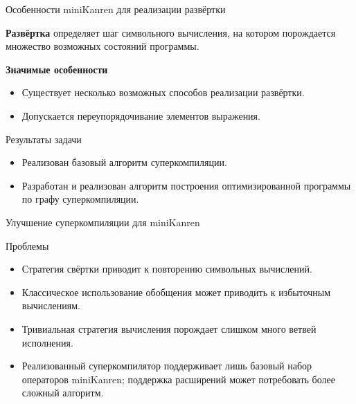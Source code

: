 \documentclass[xcolor=table]{beamer}
\begin{document}
\begin{frame}{Особенности miniKanren для реализации развёртки}
\begin{block}{}
{\bf Развёртка} определяет шаг символьного вычисления,
на котором порождается множество возможных состояний программы.
\end{block}
\vspace{0.5cm}
\begin{block}
{\bf Значимые особенности}
\begin{itemize}
\item Существует несколько возможных способов реализации развёртки.
\item Допускается переупорядочивание элементов выражения.
\end{itemize}
\end{block}
\end{frame}

\begin{frame}{Результаты задачи}
\begin{itemize}
\item Реализован базовый алгоритм суперкомпиляции.
\item Разработан и реализован алгоритм построения оптимизированной программы по графу суперкомпиляции.
\end{itemize}
\end{frame}

\begin{frame}{Улучшение суперкомпиляции для miniKanren}
\begin{block}{Проблемы}
\begin{itemize}
\item Стратегия свёртки приводит к повторению символьных вычислений.
\item Классическое использование обобщения может приводить к избыточным вычислениям.
\item Тривиальная стратегия вычисления порождает слишком много ветвей исполнения.
\item Реализованный суперкомпилятор поддерживает лишь базовый
      набор операторов miniKanren; поддержка расширений может
      потребовать более сложный алгоритм.
\end{itemize}
\end{block}
\end{frame}
\end{document}
